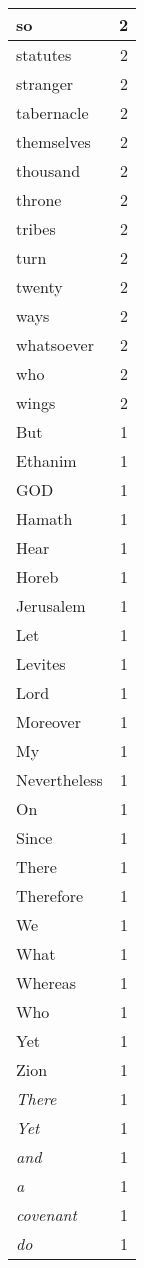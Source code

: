 \begin{center}
\begin{longtable}{l|r}
so & 2 \\ \hline
statutes & 2 \\ \hline
stranger & 2 \\ \hline
tabernacle & 2 \\ \hline
themselves & 2 \\ \hline
thousand & 2 \\ \hline
throne & 2 \\ \hline
tribes & 2 \\ \hline
turn & 2 \\ \hline
twenty & 2 \\ \hline
ways & 2 \\ \hline
whatsoever & 2 \\ \hline
who & 2 \\ \hline
wings & 2 \\ \hline
But & 1 \\ \hline
Ethanim & 1 \\ \hline
GOD & 1 \\ \hline
Hamath & 1 \\ \hline
Hear & 1 \\ \hline
Horeb & 1 \\ \hline
Jerusalem & 1 \\ \hline
Let & 1 \\ \hline
Levites & 1 \\ \hline
Lord & 1 \\ \hline
Moreover & 1 \\ \hline
My & 1 \\ \hline
Nevertheless & 1 \\ \hline
On & 1 \\ \hline
Since & 1 \\ \hline
There & 1 \\ \hline
Therefore & 1 \\ \hline
We & 1 \\ \hline
What & 1 \\ \hline
Whereas & 1 \\ \hline
Who & 1 \\ \hline
Yet & 1 \\ \hline
Zion & 1 \\ \hline
\emph{There} & 1 \\ \hline
\emph{Yet} & 1 \\ \hline
\emph{and} & 1 \\ \hline
\emph{a} & 1 \\ \hline
\emph{covenant} & 1 \\ \hline
\emph{do} & 1 \\ \hline

\end{longtable}
\end{center}
